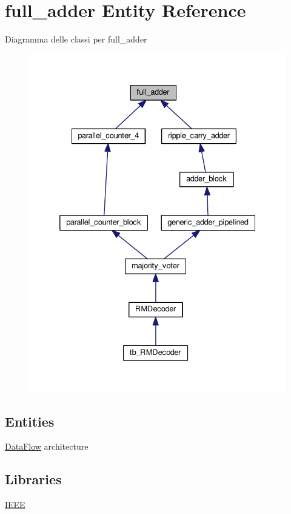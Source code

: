 \hypertarget{classfull__adder}{\section{full\+\_\+adder Entity Reference}
\label{classfull__adder}
}


Diagramma delle classi per full\+\_\+adder\nopagebreak
\begin{figure}[H]
\begin{center}
\leavevmode
\includegraphics[width=332pt]{classfull__adder__inherit__graph}
\end{center}
\end{figure}
\subsection*{Entities}
\begin{DoxyCompactItemize}
\item 
\hyperlink{classfull__adder_1_1_data_flow}{Data\+Flow} architecture
\end{DoxyCompactItemize}
\subsection*{Libraries}
 \begin{DoxyCompactItemize}
\item 
\hypertarget{classfull__adder_gae4f03c286607f3181e16b9aa12d0c6d4}{\hyperlink{group___majority_voter_gae4f03c286607f3181e16b9aa12d0c6d4}{I\+E\+E\+E} }\label{classfull__adder_gae4f03c286607f3181e16b9aa12d0c6d4}

\end{DoxyCompactItemize}
